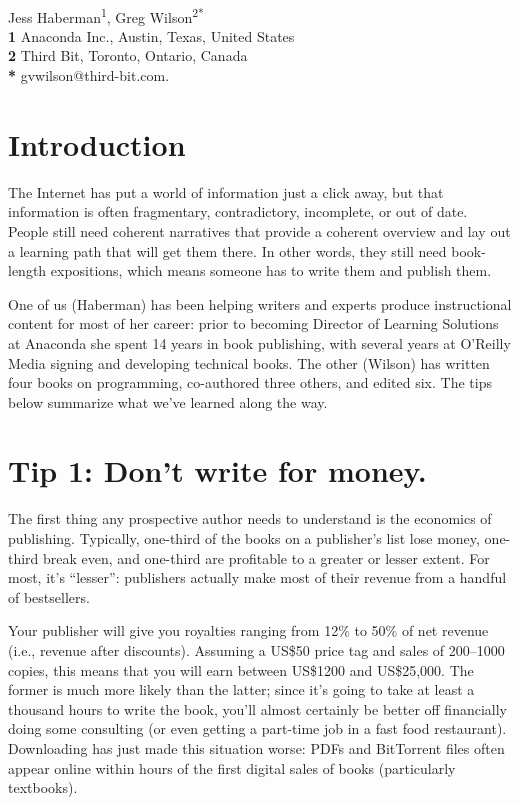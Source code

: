 \documentclass[10pt,letterpaper]{article}
\begin{document}
\vspace*{0.2in}

\begin{flushleft}
{\Large
\textbf{}
}
\newline
\\
{Jess Haberman}\textsuperscript{1},
{Greg Wilson}\textsuperscript{2*}
\\
\bigskip
\textbf{1} Anaconda Inc., Austin, Texas, United States\\
\textbf{2} Third Bit, Toronto, Ontario, Canada\\
\textbf{*} gvwilson@third-bit.com.
\end{flushleft}

\section*{Introduction}

The Internet has put a world of information just a click away,
but that information is often fragmentary, contradictory, incomplete, or out of date.
People still need coherent narratives that provide a coherent overview
and lay out a learning path that will get them there.
In other words,
they still need book-length expositions,
which means someone has to write them and publish them.

One of us (Haberman) has been helping writers and experts produce instructional content for most of her career:
prior to becoming Director of Learning Solutions at Anaconda she spent 14 years in book publishing,
with several years at O'Reilly Media signing and developing technical books.
The other (Wilson) has written four books on programming,
co-authored three others,
and edited six.
The tips below summarize what we've learned along the way.

\section*{Tip 1: Don't write for money.}

The first thing any prospective author needs to understand is
the economics of publishing.
Typically,
one-third of the books on a publisher's list lose money,
one-third break even,
and one-third are profitable to a greater or lesser extent.
For most, it's ``lesser'':
publishers actually make most of their revenue from a handful of bestsellers.

Your publisher will give you royalties ranging from 12\% to 50\% of net revenue
(i.e., revenue after discounts).
Assuming a US\$50 price tag and sales of 200–1000 copies,
this means that you will earn between US\$1200 and US\$25,000.
The former is much more likely than the latter;
since it's going to take at least a thousand hours to write the book,
you'll almost certainly be better off financially doing some consulting
(or even getting a part-time job in a fast food restaurant).
Downloading has just made this situation worse:
PDFs and BitTorrent files often appear online
within hours of the first digital sales of books (particularly textbooks).
\end{document}
